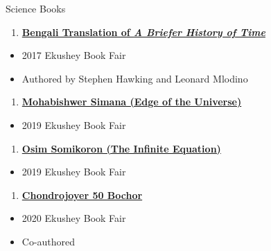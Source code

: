 \documentclass[
]{book}
\providecommand{\tightlist}{%
  \setlength{\itemsep}{0pt}\setlength{\parskip}{0pt}}
\begin{document}
Science Books

\begin{enumerate}
\def\labelenumi{\arabic{enumi}.}
\tightlist
\item
  \href{https://www.rokomari.com/book/128479/a-briefer-history-of-time}{\textbf{Bengali Translation of \emph{A Briefer History of Time} }}
\end{enumerate}

\begin{itemize}
\tightlist
\item
  2017 Ekushey Book Fair
\item
  Authored by Stephen Hawking and Leonard Mlodino
\end{itemize}

\begin{enumerate}
\def\labelenumi{\arabic{enumi}.}
\setcounter{enumi}{1}
\tightlist
\item
  \href{https://www.rokomari.com/book/177345/mohabiswer-simana}{\textbf{Mohabishwer Simana (Edge of the Universe)}}
\end{enumerate}

\begin{itemize}
\tightlist
\item
  2019 Ekushey Book Fair
\end{itemize}

\begin{enumerate}
\def\labelenumi{\arabic{enumi}.}
\setcounter{enumi}{2}
\tightlist
\item
  \href{https://www.rokomari.com/book/179175/osim-somikoron}{\textbf{Osim Somikoron (The Infinite Equation)}}
\end{enumerate}

\begin{itemize}
\tightlist
\item
  2019 Ekushey Book Fair
\end{itemize}

\begin{enumerate}
\def\labelenumi{\arabic{enumi}.}
\setcounter{enumi}{3}
\tightlist
\item
  \href{https://www.rokomari.com/book/194398/chandrojoyer-50-bochor}{\textbf{Chondrojoyer 50 Bochor}}
\end{enumerate}

\begin{itemize}
\tightlist
\item
  2020 Ekushey Book Fair
\item
  Co-authored
\end{itemize}
\end{document}
